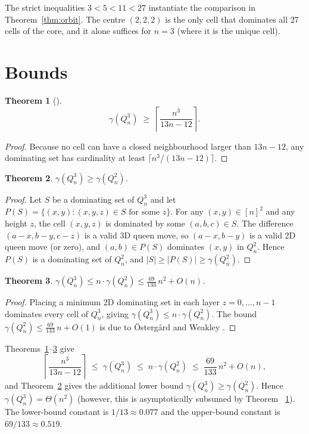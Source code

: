 \documentclass[11pt]{article}
\newtheorem{theorem}{Theorem}
\begin{document}
The strict inequalities $3 < 5 < 11 < 27$ instantiate the comparison in
Theorem~\ref{thm:orbit}. The centre $(2,2,2)$ is the only cell that dominates
all 27 cells of the core, and it alone suffices for $n = 3$ (where it is the
unique cell).

\section{Bounds}
\label{sec:bounds}

\begin{theorem}[{\cite{barrrao2007}}]
\label{thm:volume}
\[
  \gamma(Q^3_n) \;\geq\; \left\lceil \frac{n^3}{13n-12} \right\rceil.
\]
\end{theorem}

\begin{proof}
Because no cell can have a closed neighbourhood larger than $13n-12$, any
dominating set has cardinality at least $\lceil n^3/(13n-12)\rceil$.
\end{proof}

\begin{theorem}
\label{thm:projection}
$\gamma(Q^3_n) \geq \gamma(Q^2_n)$.
\end{theorem}

\begin{proof}
Let $S$ be a dominating set of $Q^3_n$ and let
$P(S) = \{(x,y) : (x,y,z) \in S \text{ for some } z\}$. For any $(x,y) \in[n]^2$ and any height $z$, the cell $(x,y,z)$ is dominated by some
$(a,b,c) \in S$. The difference $(a-x,b-y,c-z)$ is a valid 3D queen move, so
$(a-x,b-y)$ is a valid 2D queen move (or zero), and $(a,b) \in P(S)$ dominates
$(x,y)$ in $Q^2_n$. Hence $P(S)$ is a dominating set of $Q^2_n$, and
$|S| \geq |P(S)| \geq \gamma(Q^2_n)$.
\end{proof}

\begin{theorem}
\label{thm:lifting}
$\gamma(Q^3_n) \leq n\cdot\gamma(Q^2_n) \leq \tfrac{69}{133}\,n^2 + O(n)$.
\end{theorem}

\begin{proof}
Placing a minimum 2D dominating set in each layer $z = 0,\ldots,n-1$ dominates
every cell of $Q^3_n$, giving $\gamma(Q^3_n) \leq n\cdot\gamma(Q^2_n)$.
The bound $\gamma(Q^2_n) \leq \tfrac{69}{133}\,n + O(1)$ is due to
\"{O}sterg\r{a}rd and Weakley \cite{osterCardWeakley}.
\end{proof}

Theorems~\ref{thm:volume}--\ref{thm:lifting} give
\[
  \left\lceil \frac{n^3}{13n-12} \right\rceil \;\leq\; \gamma(Q^3_n) \;\leq\;
  n\cdot\gamma(Q^2_n) \;\leq\;
  \frac{69}{133}\,n^2 + O(n),
\]
and Theorem~\ref{thm:projection} gives the additional lower bound
$\gamma(Q^3_n) \geq \gamma(Q^2_n)$. Hence $\gamma(Q^3_n) = \Theta(n^2)$ (however, this is asymptotically subsumed by Theorem ~\ref{thm:volume}).
The lower-bound constant is $1/13 \approx 0.077$ and the upper-bound constant
is $69/133 \approx 0.519$.
\end{document}
